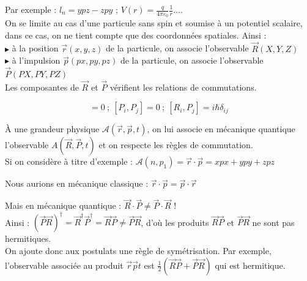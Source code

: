 \documentclass[12pt,a4paper,titlepage]{book}
\begin{document}
Par exemple : $l_n = ypz - zpy$ ; $V(r) = \frac{q}{4 \pi \varepsilon_0} \frac{1}{r} \ldots$.\\

On se limite au cas d'une particule sans spin et soumise à un potentiel scalaire, dans ce cas, on ne tient compte que des coordonnées spatiales. Ainsi :\\

$\blacktriangleright$ à la position $\overrightarrow{r} (x,y,z)$ de la particule, on associe l'observable $\overrightarrow{R} (X,Y,Z)$\\

$\blacktriangleright$ à l'impulsion $\overrightarrow{p} (px,py,pz)$ de la particule, on associe l'observable $\overrightarrow{P} (PX,PY,PZ)$\\

Les composantes de $\overrightarrow{R}$ et $\overrightarrow{P}$ vérifient les relations de commutations.

\begin{equation*}
[R_i, R_j] = 0 ~;~ [P_i, P_j] = 0 ~;~ [R_i, P_j] = i \hbar \delta_{ij}
\end{equation*}

À une grandeur physique $\mathcal{A} (\overrightarrow{r}, \overrightarrow{p}, t)$, on lui associe en mécanique quantique l'observable $A (\overrightarrow{R}, \overrightarrow{P}, t)$ et on respecte les règles de commutation.\\

Si on considère à titre d'exemple : $\mathcal{A}(n, p_1) = \overrightarrow{r} \cdot \overrightarrow{p} = xpx + ypy + zpz$

Nous aurions en mécanique classique : $\overrightarrow{r} \cdot \overrightarrow{p} = \overrightarrow{p} \cdot \overrightarrow{r}$

Mais en mécanique quantique : $\overrightarrow{R} \cdot \overrightarrow{P} \neq \overrightarrow{P} \cdot \overrightarrow{R}$ !\\

Ainsi : $(\overrightarrow{P} \overrightarrow{R})^\dagger = \overrightarrow{R}^\dagger \overrightarrow{P}^\dagger = \overrightarrow{R} \overrightarrow{P} \neq \overrightarrow{P} \overrightarrow{R}$, d'où les produits $\overrightarrow{R} \overrightarrow{P}$ et $\overrightarrow{P} \overrightarrow{R}$ ne sont pas hermitiques.\\

On ajoute donc aux postulats une règle de symétrisation. Par exemple, l'observable associée au produit $\overrightarrow{r} \overrightarrow{p} t$ est $\frac{1}{2} \left(\overrightarrow{R} \overrightarrow{P} + \overrightarrow{P} \overrightarrow{R} \right)$ qui est hermitique.
\end{document}
